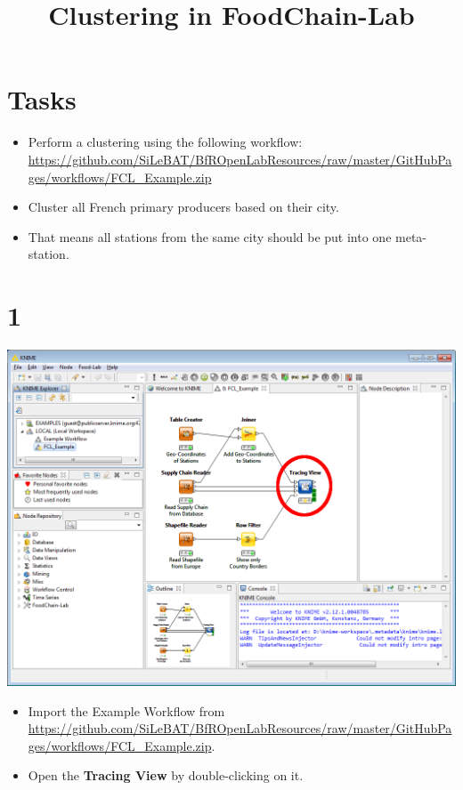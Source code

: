 \documentclass{beamer}
\title{Clustering in FoodChain-Lab}
\date{}
\begin{document}
\maketitle

\section{Tasks}
\begin{frame}
	\begin{itemize}
		\item Perform a clustering using the following workflow: \url{https://github.com/SiLeBAT/BfROpenLabResources/raw/master/GitHubPages/workflows/FCL_Example.zip}
		\item Cluster all French primary producers based on their city.
		\item That means all stations from the same city should be put into one meta-station.
	\end{itemize}
\end{frame}
 
\section{1}
\begin{frame}
	\begin{center}
  		\includegraphics[height=0.6\textheight]{1.png}
	\end{center}
	\begin{itemize}
		\item Import the Example Workflow from \url{https://github.com/SiLeBAT/BfROpenLabResources/raw/master/GitHubPages/workflows/FCL_Example.zip}.
		\item Open the \textbf{Tracing View} by double-clicking on it.
	\end{itemize}
\end{frame}
\end{document}
